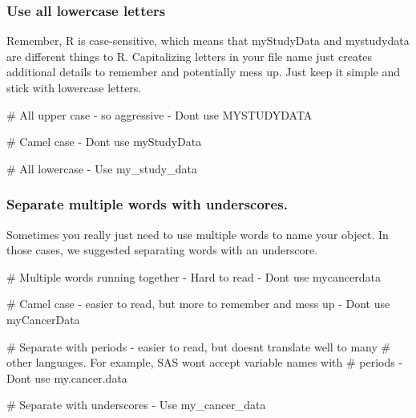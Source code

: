 \documentclass[
  letterpaper,
  DIV=11,
  numbers=noendperiod]{scrreprt}
\newenvironment{Shaded}{\begin{snugshade}}{\end{snugshade}}
\newcommand{\CommentTok}[1]{\textcolor[rgb]{0.37,0.37,0.37}{#1}}
\newcommand{\NormalTok}[1]{\textcolor[rgb]{0.00,0.23,0.31}{#1}}
\begin{document}
\subsubsection{Use all lowercase
letters}\label{use-all-lowercase-letters}

Remember, R is case-sensitive, which means that myStudyData and
mystudydata are different things to R. Capitalizing letters in your file
name just creates additional details to remember and potentially mess
up. Just keep it simple and stick with lowercase letters.

\begin{Shaded}
\begin{Highlighting}[]
\CommentTok{\# All upper case {-} so aggressive {-} Don\textquotesingle{}t use}
\NormalTok{MYSTUDYDATA}

\CommentTok{\# Camel case {-} Don\textquotesingle{}t use}
\NormalTok{myStudyData}

\CommentTok{\# All lowercase {-} Use}
\NormalTok{my\_study\_data}
\end{Highlighting}
\end{Shaded}

\subsubsection{Separate multiple words with
underscores.}\label{separate-multiple-words-with-underscores.}

Sometimes you really just need to use multiple words to name your
object. In those cases, we suggested separating words with an
underscore.

\begin{Shaded}
\begin{Highlighting}[]
\CommentTok{\# Multiple words running together {-} Hard to read {-} Don\textquotesingle{}t use}
\NormalTok{mycancerdata}

\CommentTok{\# Camel case {-} easier to read, but more to remember and mess up {-} Don\textquotesingle{}t use}
\NormalTok{myCancerData}

\CommentTok{\# Separate with periods {-} easier to read, but doesn\textquotesingle{}t translate well to many }
\CommentTok{\# other languages. For example, SAS won\textquotesingle{}t accept variable names with }
\CommentTok{\# periods {-} Don\textquotesingle{}t use}
\NormalTok{my.cancer.data}

\CommentTok{\# Separate with underscores {-} Use}
\NormalTok{my\_cancer\_data}
\end{Highlighting}
\end{Shaded}
\end{document}
